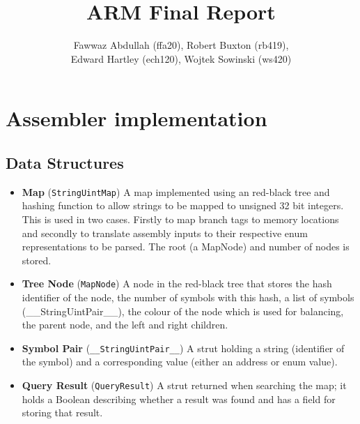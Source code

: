 \documentclass[8pt]{article}
\begin{document}
\title{ARM Final Report}
\author{Fawwaz Abdullah (ffa20), Robert Buxton (rb419), \\Edward Hartley (ech120), Wojtek Sowinski (ws420) }

\maketitle

\section{Assembler implementation}

\subsection{Data Structures}

\begin{itemize}

    \item \textbf{Map} (\texttt{StringUintMap}) A map implemented using an
    red-black tree and hashing function to allow strings to be mapped to unsigned
    32 bit integers. This is used in two cases. Firstly to map branch tags to 
    memory locations and secondly to translate assembly inputs to their respective
    enum representations to be parsed. The root (a MapNode) and number of nodes is stored.
    
    \item \textbf{Tree Node} (\texttt{MapNode}) A node in the red-black tree that 
    stores the hash identifier of the node, the number of symbols with this hash, 
    a list of symbols (\_\_StringUintPair\_\_), the colour of the node which is used for balancing, the 
    parent node, and the left and right children.

    \item \textbf{Symbol Pair} (\texttt{\_\_StringUintPair\_\_}) A strut holding a
    string (identifier of the symbol) and a corresponding value (either an 
    address or enum value). 

    
    \item \textbf{Query Result} (\texttt{QueryResult}) A strut returned when searching the map;
    it holds a Boolean describing whether a result was found and has a field for storing that result.
    
\end{itemize}
\end{document}
